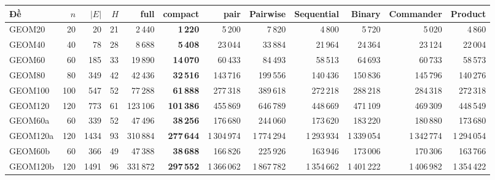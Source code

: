 \begin{tabular}{lrrrrrrrrrrr}
\toprule
Đề & $n$ & $|E|$ & $H$ & full & compact & pair & Pairwise & Sequential & Binary & Commander & Product \\
\midrule
GEOM20 & 20 & 20 & 21 & 2\,440 & \textbf{1\,220} & 5\,200 & 7\,820 & 4\,800 & 5\,720 & 5\,020 & 4\,860 \\
GEOM40 & 40 & 78 & 28 & 8\,688 & \textbf{5\,408} & 23\,044 & 33\,884 & 21\,964 & 24\,364 & 23\,124 & 22\,004 \\
GEOM60 & 60 & 185 & 33 & 19\,890 & \textbf{14\,070} & 60\,433 & 84\,493 & 58\,513 & 64\,693 & 60\,733 & 58\,573 \\
GEOM80 & 80 & 349 & 42 & 42\,436 & \textbf{32\,516} & 143\,716 & 199\,556 & 140\,436 & 150\,836 & 145\,796 & 140\,276 \\
GEOM100 & 100 & 547 & 52 & 77\,288 & \textbf{61\,888} & 277\,318 & 389\,618 & 272\,218 & 288\,218 & 284\,318 & 272\,318 \\
GEOM120 & 120 & 773 & 61 & 123\,106 & \textbf{101\,386} & 455\,869 & 646\,789 & 448\,669 & 471\,109 & 469\,309 & 448\,549 \\
GEOM60a & 60 & 339 & 52 & 47\,496 & \textbf{38\,256} & 176\,680 & 244\,060 & 173\,620 & 183\,220 & 180\,880 & 173\,680 \\
GEOM120a & 120 & 1434 & 93 & 310\,884 & \textbf{277\,644} & 1\,304\,974 & 1\,774\,294 & 1\,293\,934 & 1\,339\,054 & 1\,342\,774 & 1\,294\,054 \\
GEOM60b & 60 & 366 & 49 & 47\,388 & \textbf{38\,688} & 166\,826 & 225\,926 & 163\,946 & 173\,006 & 170\,306 & 163\,766 \\
GEOM120b & 120 & 1491 & 96 & 331\,872 & \textbf{297\,552} & 1\,366\,062 & 1\,867\,782 & 1\,354\,662 & 1\,401\,222 & 1\,406\,982 & 1\,354\,422 \\
\bottomrule
\end{tabular}
